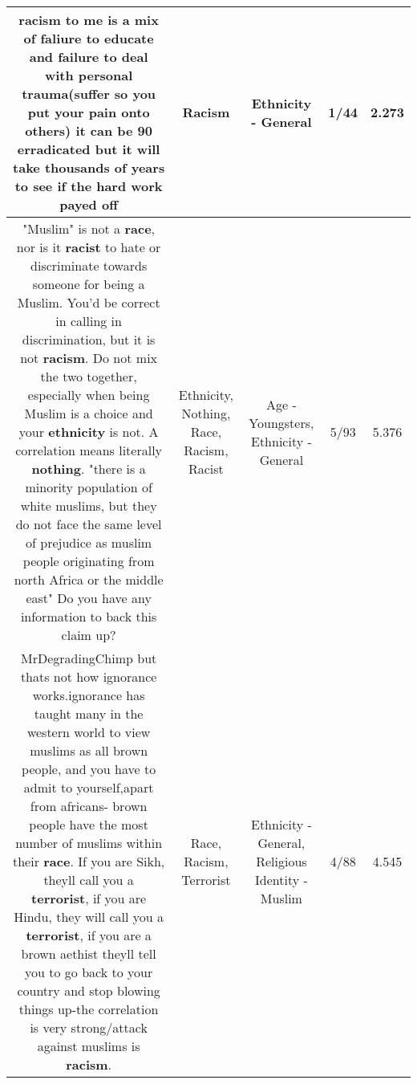 \documentclass[11pt]{article}
\newlength\mylength
\begin{document}
\begin{center}
\begin{longtable}{|C{.65\mylength}|C{.30\mylength}|C{.12\mylength}|C{.12\mylength}|C{.12\mylength}|}
  \small racism to me is a mix of faliure to educate and failure to deal with personal trauma(suffer so you put your pain onto others)  it can be 90 erradicated but it will take thousands of years to see if the hard work  payed off\normalsize   & Racism & Ethnicity - General & 1/44 & 2.273 \\  \hline
  \small "Muslim" is not a \textbf{race}, nor is it \textbf{racist} to hate or discriminate towards someone for being a Muslim. You'd be correct in calling in discrimination, but it is not \textbf{racism}. Do not mix the two together, especially when being Muslim is a choice and your \textbf{ethnicity} is not. A correlation means literally \textbf{nothing}. "there is a minority population of white muslims, but they do not face the same level of prejudice as muslim people originating from north Africa or the middle east" Do you have any information to back this claim up?\normalsize   & Ethnicity, Nothing, Race, Racism, Racist & Age - Youngsters, Ethnicity - General & 5/93 & 5.376 \\  \hline
  \small MrDegradingChimp but thats not how ignorance works.ignorance has taught many in the western world to view muslims as all brown people, and you have to admit to yourself,apart from africans- brown people have the most number of muslims within their \textbf{race}. If you are Sikh, theyll call you a \textbf{terrorist},  if you are Hindu, they will call you a \textbf{terrorist}, if you are  a brown aethist theyll tell you to go back to your country and stop blowing things up-the correlation is very strong/attack against muslims is \textbf{racism}.\normalsize   & Race, Racism, Terrorist & Ethnicity - General, Religious Identity - Muslim & 4/88 & 4.545 \\  \hline

\end{longtable}
\end{center}
\end{document}
